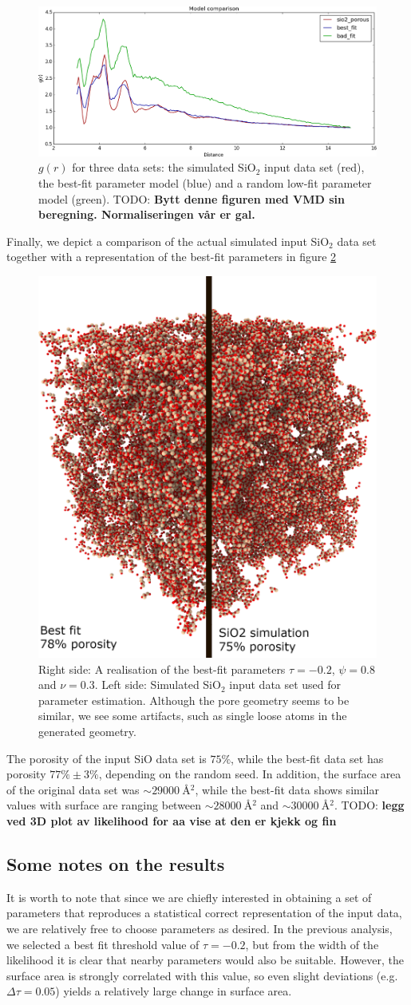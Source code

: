 \documentclass[aps,pre,twocolumn,letterpaper,floatfix,showpacs]{revtex4}
\newcommand{\todo}[1]{ {\color{Magenta} TODO: \color{Blue} \textbf{#1} }}
\begin{document}
\begin{figure}
\includegraphics[width=.45\textwidth]{gofr_plot.png}
\caption{$g(r)$ for three data sets: the simulated SiO$_2$ input data set (red), the best-fit parameter model (blue) and a random low-fit parameter model (green). \todo{Bytt denne figuren med VMD sin beregning. Normaliseringen vår er gal.}}
\label{fig:gofr1}
\end{figure}
Finally, we depict a comparison of the actual simulated input SiO$_2$ data set together with a representation of the best-fit parameters in figure \ref{fig:porous_vs_model}   
\begin{figure}
\includegraphics[width=.45\textwidth]{comparison.png}
\caption{Right side: A realisation of the best-fit parameters $\tau=-0.2$, $\psi=0.8$ and $\nu=0.3$. Left side: Simulated SiO$_2$ input data set used for parameter estimation. Although the pore geometry seems to be similar, we see some artifacts, such as single loose atoms in the generated geometry.}
\label{fig:porous_vs_model}
\end{figure}

The porosity of the input SiO data set is $75\%$, while the best-fit data set has porosity $77\% \pm 3 \%$, depending on the random seed. In addition, the surface area of the original data set was $\sim \SI{29000}{\angstrom^2}$, while the best-fit data shows similar values with surface are ranging between $\sim \SI{28000}{\angstrom^2}$ and $\sim \SI{30000}{\angstrom^2}$.
\todo{legg ved 3D plot av likelihood for aa vise at den er kjekk og fin}

\subsection{Some notes on the results}
It is worth to note that since we are chiefly interested in obtaining a set of parameters that reproduces a statistical correct representation of the input data, we are relatively free to choose parameters as desired. In the previous analysis, we selected a best fit threshold value of $\tau=-0.2$, but from the width of the likelihood it is clear that nearby parameters would also be suitable. However, the surface area is strongly correlated with this value, so even slight deviations (e.g. $\Delta \tau = 0.05$) yields a relatively large change in surface area. 
\end{document}
